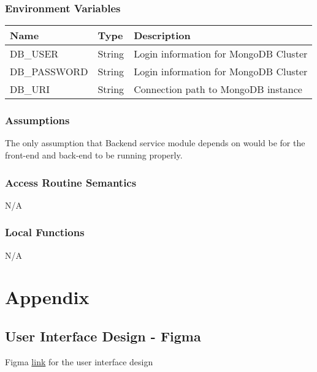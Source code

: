 \documentclass[12pt, titlepage]{article}
\begin{document}
\subsubsection{Environment Variables}

\begin{center}
\begin{tabular}{|p{4cm} |p{4cm} |p{4cm}|}
\hline
\textbf{Name} & \textbf{Type} & \textbf{Description} \\
\hline
DB\_USER & String& Login information for MongoDB Cluster \\
\hline
DB\_PASSWORD & String & Login information for MongoDB Cluster \\
\hline
DB\_URI & String & Connection path to MongoDB instance \\
\hline
\end{tabular}
\end{center}

\subsubsection{Assumptions}

The only assumption that Backend service module depends on would be for the front-end and back-end to be running properly. 

\subsubsection{Access Routine Semantics}

N/A

\subsubsection{Local Functions}

N/A

\newpage

\section{Appendix} \label{Appendix}

\subsection{User Interface Design - Figma}

Figma \href{https://www.figma.com/file/i2Q2VBK5So9Fr4Y0fTfo8U/MCT-Design?type=design&node-id=0%3A1&mode=design&t=luirTXz6ZzzY3WR5-1}{link} for the user interface design
\end{document}
